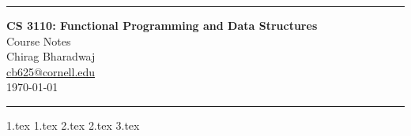 \documentclass[10pt]{article}
\begin{document}
\begin{center}
    \hrule
    \vspace{\baselineskip}
    \noindent
    \LARGE{\textbf{CS 3110: Functional Programming and Data Structures}} \\
    \Large{Course Notes} \\
    \vspace{\baselineskip}
    \large{Chirag Bharadwaj} \\
    \large{\href{mailto:cb625@cornell.edu}{\textsf{cb625@cornell.edu}}} \\
    \vspace{\baselineskip}
    \large{\thedate\today} \\
    \vspace{\baselineskip}
    \hrule
\end{center}

{1.tex}
{1.tex}
{2.tex}
{2.tex}
{3.tex}
\end{document}

